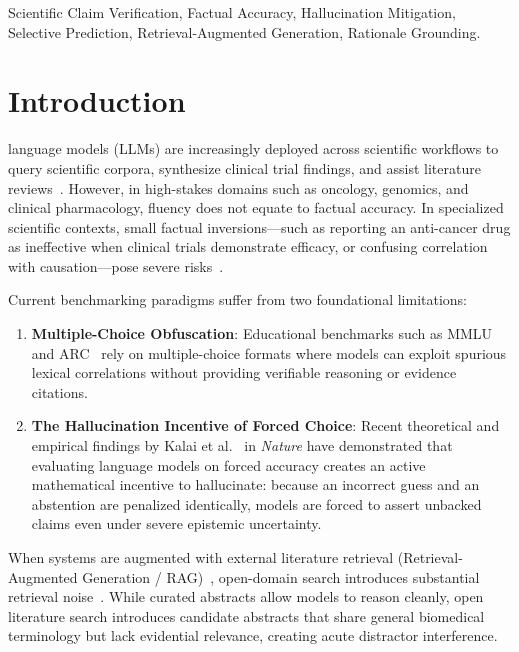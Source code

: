 \documentclass[10pt,journal,compsoc]{IEEEtran}
\begin{document}
{\begin{IEEEkeywords}
Scientific Claim Verification, Factual Accuracy, Hallucination Mitigation, Selective Prediction, Retrieval-Augmented Generation, Rationale Grounding.
\end{IEEEkeywords}}

\maketitle
\IEEEdisplaynontitleabstractindextext
\IEEEpeerreviewmaketitle

\section{Introduction}
 language models (LLMs) are increasingly deployed across scientific workflows to query scientific corpora, synthesize clinical trial findings, and assist literature reviews~\cite{wang2024factuality, huang2025survey}. However, in high-stakes domains such as oncology, genomics, and clinical pharmacology, fluency does not equate to factual accuracy. In specialized scientific contexts, small factual inversions—such as reporting an anti-cancer drug as ineffective when clinical trials demonstrate efficacy, or confusing correlation with causation—pose severe risks~\cite{singhal2023large, wysocka2024large}.

Current benchmarking paradigms suffer from two foundational limitations:
\begin{enumerate}
    \item \textbf{Multiple-Choice Obfuscation}: Educational benchmarks such as MMLU~\cite{hendrycks2021measuring} and ARC~\cite{clark2018think} rely on multiple-choice formats where models can exploit spurious lexical correlations without providing verifiable reasoning or evidence citations.
    \item \textbf{The Hallucination Incentive of Forced Choice}: Recent theoretical and empirical findings by Kalai et al.~\cite{kalai2026evaluating} in \textit{Nature} have demonstrated that evaluating language models on forced accuracy creates an active mathematical incentive to hallucinate: because an incorrect guess and an abstention are penalized identically, models are forced to assert unbacked claims even under severe epistemic uncertainty.
\end{enumerate}

When systems are augmented with external literature retrieval (Retrieval-Augmented Generation / RAG)~\cite{lewis2020retrieval}, open-domain search introduces substantial retrieval noise~\cite{wadden2022scifact}. While curated abstracts allow models to reason cleanly, open literature search introduces candidate abstracts that share general biomedical terminology but lack evidential relevance, creating acute distractor interference.
\end{document}
